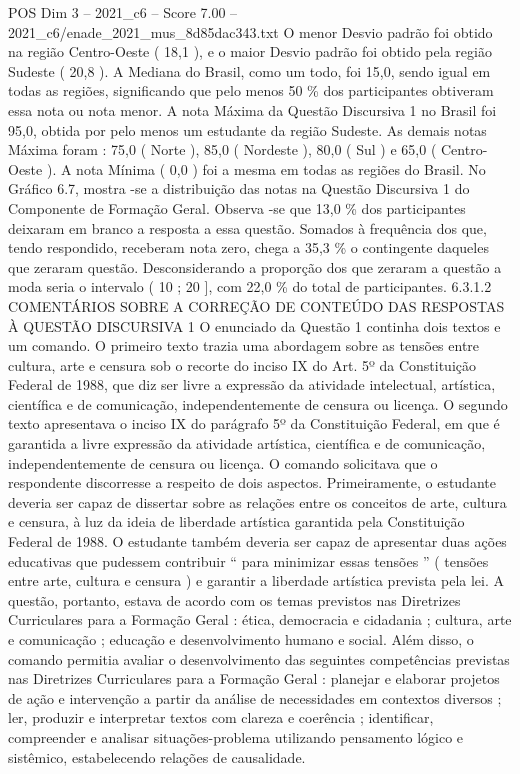 \begin{textsample}{POS Dim 3 – 2021\_c6 – Score 7.00 – 2021\_c6/enade\_2021\_mus\_8d85dac343.txt}
O menor Desvio padrão foi obtido na região Centro-Oeste ( 18,1 ), e o maior Desvio padrão foi obtido pela região Sudeste ( 20,8 ).
A Mediana do Brasil, como um todo, foi 15,0, sendo igual em todas as regiões, significando que pelo menos 50 \% dos participantes obtiveram essa nota ou nota menor.
A nota Máxima da Questão Discursiva 1 no Brasil foi 95,0, obtida por pelo menos um estudante da região Sudeste.
As demais notas Máxima foram : 75,0 ( Norte ), 85,0 ( Nordeste ), 80,0 ( Sul ) e 65,0 ( Centro-Oeste ).
A nota Mínima ( 0,0 ) foi a mesma em todas as regiões do Brasil.
No Gráfico 6.7, mostra -se a distribuição das notas na Questão Discursiva 1 do Componente de Formação Geral.
Observa -se que 13,0 \% dos participantes deixaram em branco a resposta a essa questão.
Somados à frequência dos que, tendo respondido, receberam nota zero, chega a 35,3 \% o contingente daqueles que zeraram questão.
Desconsiderando a proporção dos que zeraram a questão a moda seria o intervalo ( 10 ; 20 ], com 22,0 \% do total de participantes. 6.3.1.2 COMENTÁRIOS SOBRE A CORREÇÃO DE CONTEÚDO DAS RESPOSTAS À QUESTÃO DISCURSIVA 1 O enunciado da Questão 1 continha dois textos e um comando.
O primeiro texto trazia uma abordagem sobre as tensões entre cultura, arte e censura sob o recorte do inciso IX do Art. 5º da Constituição Federal de 1988, que diz ser livre a expressão da atividade intelectual, artística, científica e de comunicação, independentemente de censura ou licença.
O segundo texto apresentava o inciso IX do parágrafo 5º da Constituição Federal, em que é garantida a livre expressão da atividade artística, científica e de comunicação, independentemente de censura ou licença.
O comando solicitava que o respondente discorresse a respeito de dois aspectos.
Primeiramente, o estudante deveria ser capaz de dissertar sobre as relações entre os conceitos de arte, cultura e censura, à luz da ideia de liberdade artística garantida pela Constituição Federal de 1988.
O estudante também deveria ser capaz de apresentar duas ações educativas que pudessem contribuir “ para minimizar essas tensões ” ( tensões entre arte, cultura e censura ) e garantir a liberdade artística prevista pela lei.
A questão, portanto, estava de acordo com os temas previstos nas Diretrizes Curriculares para a Formação Geral : ética, democracia e cidadania ; cultura, arte e comunicação ; educação e desenvolvimento humano e social.
Além disso, o comando permitia avaliar o desenvolvimento das seguintes competências previstas nas Diretrizes Curriculares para a Formação Geral : planejar e elaborar projetos de ação e intervenção a partir da análise de necessidades em contextos diversos ; ler, produzir e interpretar textos com clareza e coerência ; identificar, compreender e analisar situações-problema utilizando pensamento lógico e sistêmico, estabelecendo relações de causalidade.

\end{textsample}
